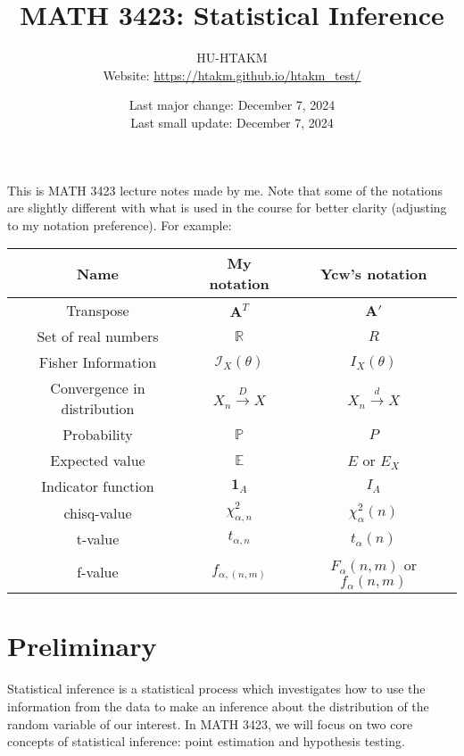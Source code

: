 \documentclass{huhtakm-template-book-v2}
\title{
	\Huge MATH 3423: Statistical Inference
}
\author{
	HU-HTAKM\\
	\small Website: \url{https://htakm.github.io/htakm_test/}
}
\date{
	Last major change: December 7, 2024\\
	Last small update: December 7, 2024
}
\DeclareMathOperator{\prob}{\mathbb{P}}
\DeclareMathOperator{\E}{\mathbb{E}}
\begin{document}
\maketitle
This is MATH 3423 lecture notes made by me. Note that some of the notations are slightly different with what is used in the course for better clarity (adjusting to my notation preference). For example:\\
\begin{tabular}{||c|c|c||}
	\hline
	Name & My notation & Ycw's notation\\
	\hline
	Transpose & $\mathbf{A}^{T}$ &  $\mathbf{A}'$\\
	Set of real numbers & $\mathbb{R}$ & $R$\\
	Fisher Information & $\mathcal{I}_{X}(\theta)$ & $I_{X}(\theta)$\\
	Convergence in distribution & $X_{n}\xrightarrow{D}X$ & $X_{n}\xrightarrow{d}X$\\
	Probability & $\prob$ & $P$\\
	Expected value & $\E$ & $E$ or $E_{X}$\\
	Indicator function & $\mathbf{1}_{A}$ & $I_{A}$\\
	chisq-value & $\chi_{\alpha,n}^{2}$ & $\chi_{\alpha}^{2}(n)$\\
	t-value & $t_{\alpha,n}$ & $t_{\alpha}(n)$\\
	f-value & $f_{\alpha,(n,m)}$ & $F_{\alpha}(n,m)$ or $f_{\alpha}(n,m)$\\
	\hline
\end{tabular}
\tableofcontents
\chapter{Preliminary}
Statistical inference is a statistical process which investigates how to use the information from the data to make an inference about the distribution of the random variable of our interest. In MATH 3423, we will focus on two core concepts of statistical inference: point estimation and hypothesis testing.
\end{document}
